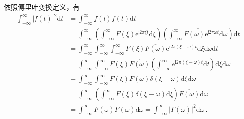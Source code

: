 \begin{prove}
    依照傅里叶变换定义，有
    \begin{align}
        \int_{-\infty}^{\infty}|f(t)|^2\mathrm{d}t & =\int_{-\infty}^{\infty}f(t)\overline{f(t)}\mathrm{d}t\nonumber                                                                                                                                                                                \\
                                                   & =\int_{-\infty}^{\infty}\left(\int_{-\infty}^{\infty}F(\xi)\mathrm{e}^{\mathrm{i}2\pi\xi t}\mathrm{d}\xi\right)\left(\overline{\int_{-\infty}^{\infty}F(\omega)\mathrm{e}^{\mathrm{i}2\pi\omega t}\mathrm{d}\omega}\right)\mathrm{d}t\nonumber \\
                                                   & =\int_{-\infty}^{\infty}\int_{-\infty}^{\infty}\int_{-\infty}^{\infty}F(\xi)\overline{F(\omega)}\mathrm{e}^{\mathrm{i}2\pi(\xi-\omega) t}\mathrm{d}\xi\mathrm{d}\omega\mathrm{d}t\nonumber                                                     \\
                                                   & =\int_{-\infty}^{\infty}\int_{-\infty}^{\infty}F(\xi)\overline{F(\omega)}\left(\int_{-\infty}^{\infty}\mathrm{e}^{\mathrm{i}2\pi(\xi-\omega) t}\mathrm{d}t\right)\mathrm{d}\xi\mathrm{d}\omega\nonumber                                        \\
                                                   & =\int_{-\infty}^{\infty}\int_{-\infty}^{\infty}F(\xi)\overline{F(\omega)}\delta(\xi-\omega)\mathrm{d}\xi\mathrm{d}\omega\nonumber                                                                                                              \\
                                                   & =\int_{-\infty}^{\infty}\left(\int_{-\infty}^{\infty}F(\xi)\delta(\xi-\omega)\mathrm{d}\xi\right)\overline{F(\omega)}\mathrm{d}\omega\nonumber                                                                                                 \\
                                                   & =\int_{-\infty}^{\infty}F(\omega)\overline{F(\omega)}\mathrm{d}\omega=\int_{-\infty}^{\infty}|F(\omega)|^2\mathrm{d}\omega\, .
    \end{align}
\end{prove}

